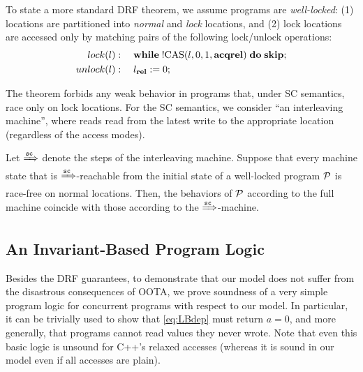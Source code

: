 To state a more standard DRF theorem, 
we assume programs are \emph{well-locked}:
(1) locations are partitioned into \emph{normal} and \emph{lock} locations, and
(2) lock locations are accessed only by matching pairs of the following lock/unlock operations:
\begin{align*}
lock(l) & : \quad \textbf{while}\;!\textrm{CAS}({l},{0},{1},{\textbf{acq}\textbf{rel}})\;\textbf{do}\;\textbf{skip}; \\
unlock(l) & : \quad l_{\textbf{rel}} := 0; 
\end{align*}

The theorem forbids any weak behavior in programs that, under SC semantics, race only on lock locations.
For the SC semantics, we consider ``an interleaving machine'', 
where reads read from the latest write to the appropriate location
(regardless of the access modes).

\begin{theorem}
\label{thm:drflock}
Let $\xRightarrow{{\texttt{sc}}}$ denote the steps of the interleaving machine.
Suppose that every machine state that is $\xRightarrow{{\texttt{sc}}}$-reachable from
the initial state of a well-locked program $\mathcal{P}$ is race-free on normal locations.
Then, the behaviors of $\mathcal{P}$ according to the full machine coincide with those
according to the $\xRightarrow{{\texttt{sc}}}$-machine.
\end{theorem}




\subsection{An Invariant-Based Program Logic}
\label{sec:invariant}
Besides the DRF guarantees, to demonstrate that our model does not suffer from
the disastrous consequences of OOTA, 
we prove soundness of a very simple program logic for concurrent programs with respect to our model.
In particular, it can be trivially used to show that \ref{eq:LBdep} must return $a=0$,
and more generally, that programs cannot read values they never wrote.
Note that even this basic logic is unsound for C++'s relaxed accesses
(whereas it is sound in our model even if all accesses are plain).

